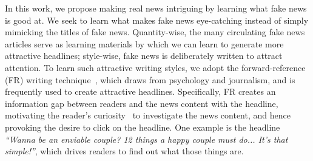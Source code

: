 In this work, we propose making real news intriguing by learning what fake
news is good at. We seek to learn what makes fake news eye-catching
instead of simply mimicking the titles of fake news. 
Quantity-wise, the many circulating fake news articles serve as learning materials by
which we can learn to generate more attractive headlines; 
style-wise, fake news is deliberately written to attract attention.  
To learn such attractive writing styles, we adopt the forward-reference (FR)
writing technique~\cite{BLOM201587}, which draws from
psychology and journalism, and is frequently used to create attractive headlines.
Specifically, FR creates an information gap between readers and the news content
with the headline, motivating the reader's curiosity~\cite{psychologyofcuriosity} 
to investigate the news content, and hence provoking the desire to click on the
headline.
One example is the headline \textit{``Wanna be an enviable couple? 12 things a
happy couple must do... It's that simple!''}, which drives readers to find out
what those things are. 

